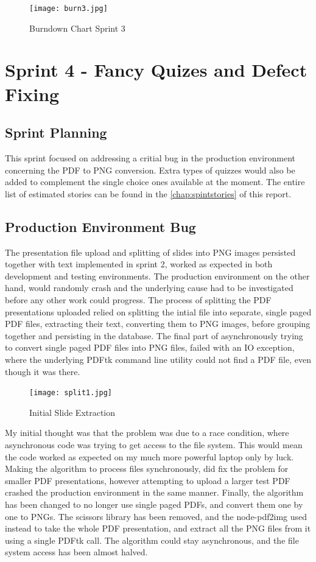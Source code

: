 \begin{figure}[h!]
    \centering
    \texttt{[image: burn3.jpg]}
    \caption{Burndown Chart Sprint 3}
    \label{fig:burn3}
\end{figure}

\newpage
\section{Sprint 4 - Fancy Quizes and Defect Fixing}
\subsection{Sprint Planning}
This sprint focused on addressing a critial bug in the production environment
concerning the PDF to PNG conversion. Extra types of quizzes would also be added
to complement the single choice ones available at the moment. The entire list of estimated stories
can be found in the \autoref{chap:spintstories} of this report.

\subsection{Production Environment Bug}
The presentation file upload and splitting of slides into PNG images persisted
together with text implemented in sprint 2, worked as expected in both development and testing environments.
The production environment on the other hand, would randomly crash and the underlying cause had
to be investigated before any other work could progress. The process of splitting the
PDF presentations uploaded relied on splitting the intial file into separate, single
paged PDF files, extracting their text, converting them to PNG images, before grouping
together and persisting in the database. The final part of asynchronously trying
to convert single paged PDF files into PNG files, failed with an IO exception, where
the underlying PDFtk\cite{55} command line utility could not find a PDF file, even though it was
there.

\begin{figure}[h!]
    \centering
    \texttt{[image: split1.jpg]}
    \caption{Initial Slide Extraction}
    \label{fig:split1}
\end{figure}

\newpage
My initial thought was that the problem was due to a race condition, where asynchronous
code was trying to get access to the file system. This would mean the code worked as expected
on my much more powerful laptop only by luck. Making the algorithm to process
files synchronously, did fix the problem for smaller PDF presentations, however attempting
to upload a larger test PDF crashed the production environment in the same manner.
Finally, the algorithm has been changed to no longer use single paged PDFs, and convert them
one by one to PNGs. The scissors library has been removed, and the node-pdf2img\cite{56} used
instead to take the whole PDF presentation, and extract all the PNG files from it using a
single PDFtk call. The algorithm could stay asynchronous, and the file system access has been almost halved.

